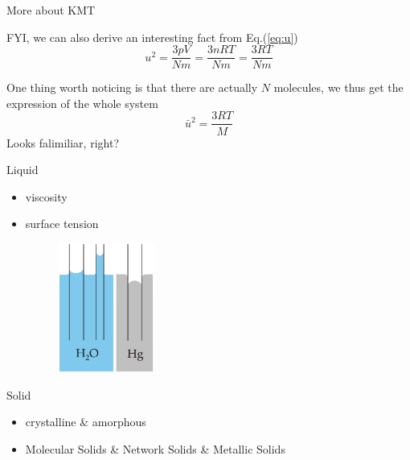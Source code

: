 \documentclass[12pt,compress]{beamer}
\begin{document}
\begin{frame}{More about KMT}
	\par FYI, we can also derive an interesting fact from Eq.(\ref{eq:u})
	\begin{equation}
		u^2 = \frac{3pV}{Nm} = \frac{3nRT}{Nm} = \frac{3RT}{Nm}
	\end{equation}
	\par One thing worth noticing is that there are actually $N$ molecules,
	we thus get the expression of the whole system
	\begin{equation}
		\bar{u}^2 = \frac{3RT}{M}
	\end{equation}
	Looks falimiliar, right?
\end{frame}

\begin{frame}{Liquid}
	\begin{itemize}
		\item viscosity
		\item surface tension
		      \begin{figure}[!htbp]
			      \centering
			      \includegraphics[width=0.3\textwidth]{Capillarity.png}
		      \end{figure}
	\end{itemize}
\end{frame}

\begin{frame}{Solid}
	\begin{itemize}
		\item crystalline \& amorphous
		\item Molecular Solids \& Network Solids \& Metallic Solids
	\end{itemize}
\end{frame}
\end{document}
